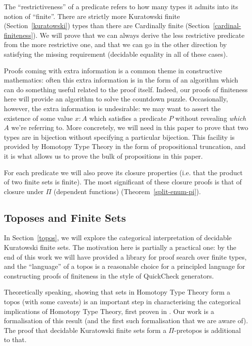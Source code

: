 The ``restrictiveness'' of a predicate refers to how many types it admits into
its notion of ``finite''.
There are strictly more Kuratowski finite (Section~\ref{kuratowski}) types than
there are Cardinally finite (Section~\ref{cardinal-finiteness}).
We will prove that we can always derive the less restrictive predicate from the
more restrictive one, and that we can go in the other direction by satisfying
the missing requirement (decidable equality in all of these cases).

Proofs coming with extra information is a common theme in constructive
mathematics: often this extra information is in the form of an algorithm which
can do something useful related to the proof itself.
Indeed, our proofs of finiteness here will provide an algorithm to solve the
countdown puzzle.
Occasionally, however, the extra information is undesirable: we may want to
assert the existence of some value \(x : A\) which satisfies a predicate \(P\)
without revealing \emph{which} \(A\) we're referring to.
More concretely, we will need in this paper to prove that two types are in
bijection without specifying a particular bijection.
This facility is provided by Homotopy Type Theory \cite{hottbook} in the form of
propositional truncation, and it is what allows us to prove the bulk of
propositions in this paper.

For each predicate we will also prove its closure properties (i.e. that the
product of two finite sets is finite).
The most significant of these closure proofs is that of closure under \(\Pi\)
(dependent functions) (Theorem~\ref{split-enum-pi}).
\subsection{Toposes and Finite Sets}
In Section~\ref{topos}, we will explore the categorical interpretation of
decidable Kuratowski finite sets.
The motivation here is partially a practical one: by the end of this work we
will have provided a library for proof search over finite types, and the
``language'' of a topos is a reasonable choice for a principled language for
constructing proofs of finiteness in the style of QuickCheck
\cite{claessenQuickCheckLightweightTool2011} generators.

Theoretically speaking, showing that sets in Homotopy Type Theory form a topos
(with some caveats) is an important step in characterising the categorical
implications of Homotopy Type Theory, first proven in
\cite{rijkeSetsHomotopyType2015}.
Our work is a formalisation of this result (and the first such formalisation
that we are aware of).
The proof that decidable Kuratowski finite sets form a \(\Pi\)-pretopos is
additional to that.
